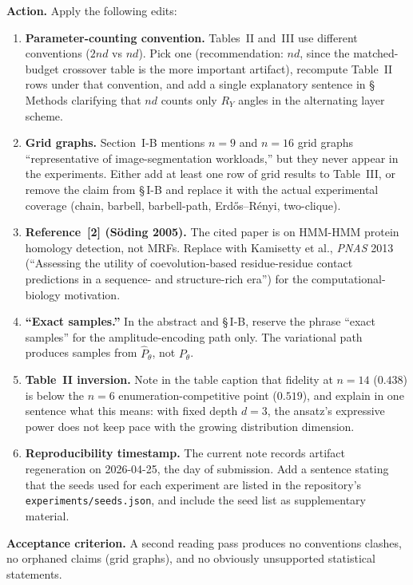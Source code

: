 \documentclass[conference,10pt]{IEEEtran}
\begin{document}
\textbf{Action.} Apply the following edits:
\begin{enumerate}[leftmargin=*]
    \item \textbf{Parameter-counting convention.} Tables~II and~III use
    different conventions ($2nd$ vs $nd$). Pick one (recommendation: $nd$,
    since the matched-budget crossover table is the more important
    artifact), recompute Table~II rows under that convention, and add a
    single explanatory sentence in \S\,Methods clarifying that $nd$
    counts only $R_Y$ angles in the alternating layer scheme.
    \item \textbf{Grid graphs.} Section~I-B mentions $n=9$ and $n=16$ grid
    graphs ``representative of image-segmentation workloads,'' but they
    never appear in the experiments. Either add at least one row of grid
    results to Table~III, or remove the claim from \S\,I-B and replace it
    with the actual experimental coverage (chain, barbell, barbell-path,
    Erd\H{o}s--R\'enyi, two-clique).
    \item \textbf{Reference~[2] (S\"oding 2005).} The cited paper is on
    HMM-HMM protein homology detection, not MRFs. Replace with Kamisetty
    et al., \emph{PNAS} 2013 (``Assessing the utility of coevolution-based
    residue-residue contact predictions in a sequence- and
    structure-rich era'') for the computational-biology motivation.
    \item \textbf{``Exact samples.''} In the abstract and \S\,I-B,
    reserve the phrase ``exact samples'' for the amplitude-encoding path
    only. The variational path produces samples from $\hat P_{\theta}$,
    not $P_{\theta}$.
    \item \textbf{Table~II inversion.} Note in the table caption that
    fidelity at $n=14$ ($0.438$) is below the $n=6$ enumeration-competitive
    point ($0.519$), and explain in one sentence what this means: with
    fixed depth $d=3$, the ansatz's expressive power does not keep pace
    with the growing distribution dimension.
    \item \textbf{Reproducibility timestamp.} The current note records
    artifact regeneration on 2026-04-25, the day of submission. Add a
    sentence stating that the seeds used for each experiment are listed
    in the repository's \texttt{experiments/seeds.json}, and include the
    seed list as supplementary material.
\end{enumerate}

\textbf{Acceptance criterion.} A second reading pass produces no
conventions clashes, no orphaned claims (grid graphs), and no obviously
unsupported statistical statements.
\end{document}
